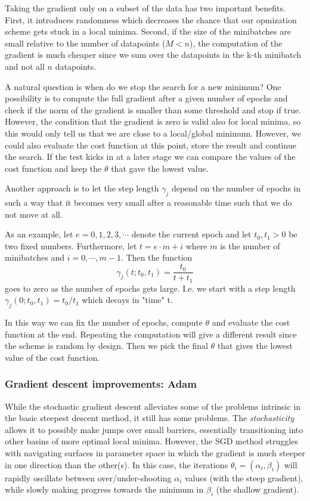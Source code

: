 \documentclass[a4paper, twocolumn]{article}
\begin{document}
Taking the gradient only on a subset of the data has two important benefits. First, it introduces randomness 
which decreases the chance that our opmization scheme gets stuck in a local minima. Second, if the size of the 
minibatches are small relative to the number of datapoints ($M < n$), the computation of the gradient is much cheaper 
since we sum over the datapoints in the k-th minibatch and not all $n$ datapoints. 

A natural question is when do we stop the search for a new minimum? One possibility is to compute the full gradient after a 
given number of epochs and check if the norm of the gradient is smaller than some threshold and stop if true. However, 
the condition that the gradient is zero is valid also for local minima, so this would only tell us that we are close to a 
local/global minimum. However, we could also evaluate the cost function at this point, store the result and continue 
the search. If the test kicks in at a later stage we can compare the values of the cost function and keep the $\theta$ that 
gave the lowest value. 

Another approach is to let the step length $\gamma_j$ depend on the number of epochs in such a way that it becomes very small 
after a reasonable time such that we do not move at all. 

As an example, let $e = 0,1,2,3,\cdots$ denote the current epoch and let $t_0, t_1 > 0$ be two fixed numbers. Furthermore, 
let $t = e \cdot m + i$ where $m$ is the number of minibatches and $i=0,\cdots,m-1$. Then the function 
\begin{equation}\gamma_j(t; t_0, t_1) = \frac{t_0}{t+t_1} \end{equation}
goes to zero as the number of epochs gets large. I.e. we start with a step length $\gamma_j (0; t_0, t_1) = t_0/t_1$ which 
decays in "time" t. 

In this way we can fix the number of epochs, compute $\theta$ and evaluate the cost function at the end. Repeating the 
computation will give a different result since the scheme is random by design. Then we pick the final $\theta$ that gives 
the lowest value of the cost function.

\subsubsection{Gradient descent improvements: Adam}
While the stochastic gradient descent alleviates some of the problems intrinsic in the basic steepest descent method, it still has some problems. The \textit{stochasticity} allows it to possibly make jumps over small barriers, essentially transitioning into other basins of more optimal local minima. However, the SGD method struggles with navigating surfaces in parameter space in which the gradient is much steeper in one direction than the other(s). In this case, the iterations $\theta_i=(\alpha_i,\beta_i)$ will rapidly oscillate between over/under-shooting $\alpha_i$ values (with the steep gradient), while slowly making progress towards the minimum in $\beta_i$ (the shallow gradient).
\end{document}
